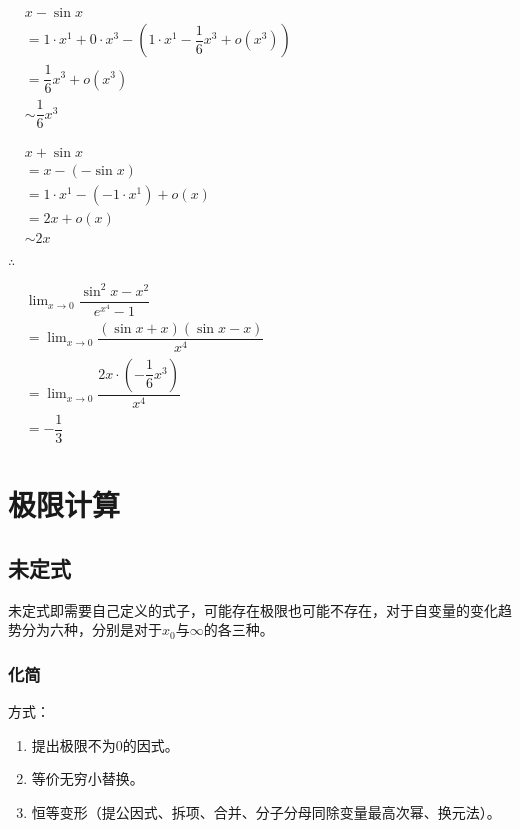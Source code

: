 \documentclass[UTF8, 12pt]{ctexart}
\begin{document}
$
\begin{aligned}
    & x-\sin x \\
    & = 1\cdot x^1+0\cdot x^3 - (1\cdot x^1-\dfrac{1}{6}x^3+o(x^3)) \\
    & = \dfrac{1}{6}x^3+o(x^3) \\
    & \sim \dfrac{1}{6}x^3
\end{aligned}
$

$
\begin{aligned}
    & x+\sin x \\
    & =x-(-\sin x) \\
    & =1\cdot x^1-(-1\cdot x^1)+o(x) \\
    & =2x+o(x) \\
    & \sim 2x
\end{aligned}
$

$\therefore$ \bigskip

$
\begin{aligned}
    & \lim_{x\to 0}\dfrac{\sin^2x-x^2}{e^{x^4}-1} \\
    & =\lim_{x\to 0}\dfrac{(\sin x+x)(\sin x-x)}{x^4} \\
    & =\lim_{x\to 0}\dfrac{2x\cdot\left(-\dfrac{1}{6}x^3\right)}{x^4} \\
    & =-\dfrac{1}{3}
\end{aligned}
$



\section{极限计算}

\subsection{未定式}

未定式即需要自己定义的式子，可能存在极限也可能不存在，对于自变量的变化趋势分为六种，分别是对于$x_0$与$\infty$的各三种。

\subsubsection{化简}

方式：

\begin{enumerate}
    \item 提出极限不为0的因式。
    \item 等价无穷小替换。
    \item 恒等变形（提公因式、拆项、合并、分子分母同除变量最高次幂、换元法）。
\end{enumerate}
\end{document}
